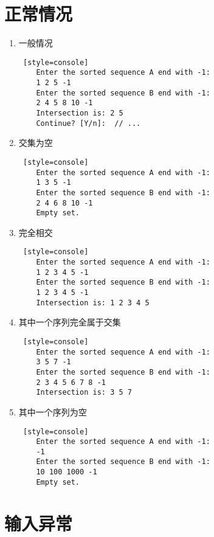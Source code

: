 \section{正常情况}
\begin{enumerate}
    \item 一般情况
\begin{lstlisting} [style=console]
    Enter the sorted sequence A end with -1: 
    1 2 5 -1
    Enter the sorted sequence B end with -1: 
    2 4 5 8 10 -1
    Intersection is: 2 5 
    Continue? [Y/n]:  // ...
\end{lstlisting}

    \item 交集为空
\begin{lstlisting} [style=console]
    Enter the sorted sequence A end with -1: 
    1 3 5 -1
    Enter the sorted sequence B end with -1: 
    2 4 6 8 10 -1
    Empty set.
\end{lstlisting}    

    \item 完全相交
\begin{lstlisting} [style=console]
    Enter the sorted sequence A end with -1: 
    1 2 3 4 5 -1
    Enter the sorted sequence B end with -1: 
    1 2 3 4 5 -1
    Intersection is: 1 2 3 4 5 
\end{lstlisting}    

    \item 其中一个序列完全属于交集
\begin{lstlisting} [style=console]
    Enter the sorted sequence A end with -1: 
    3 5 7 -1
    Enter the sorted sequence B end with -1: 
    2 3 4 5 6 7 8 -1
    Intersection is: 3 5 7 
\end{lstlisting}

    \item 其中一个序列为空
\begin{lstlisting} [style=console]
    Enter the sorted sequence A end with -1: 
    -1
    Enter the sorted sequence B end with -1: 
    10 100 1000 -1
    Empty set.
\end{lstlisting}

\end{enumerate}

\vspace*{3cm}

\section{输入异常}

